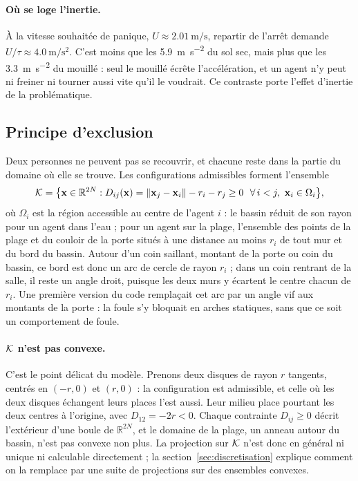 \paragraph{Où se loge l'inertie.}
À la vitesse souhaitée de panique, $U\approx\SI{2.01}{\metre\per\second}$,
repartir de l'arrêt demande $U/\tau\approx\SI{4.0}{\metre\per\second\squared}$.
C'est moins que les \SI{5.9}{\metre\per\second\squared} du sol sec, mais plus que
les \SI{3.3}{\metre\per\second\squared} du mouillé : seul le mouillé écrête
l'accélération, et un agent n'y peut ni freiner ni tourner aussi vite qu'il le
voudrait. Ce contraste porte l'effet d'inertie de la problématique.

\subsection{Principe d'exclusion}
\label{sec:exclusion}

Deux personnes ne peuvent pas se recouvrir, et chacune reste dans la partie du
domaine où elle se trouve. Les configurations admissibles forment l'ensemble
\begin{equation}
\label{eq:admissible}
\mathcal{K}=\bigl\{\mathbf{x}\in\mathbb{R}^{2N} :
D_{ij}(\mathbf{x})=\left\lVert \mathbf{x}_j-\mathbf{x}_i \right\rVert-r_i-r_j\geq 0\ \ \forall\, i<j,\
\mathbf{x}_i\in\Omega_i\bigr\},
\end{equation}
où $\Omega_i$ est la région accessible au centre de l'agent $i$ : le bassin
réduit de son rayon pour un agent dans l'eau ; pour un agent sur la plage,
l'ensemble des points de la plage et du couloir de la porte situés à une
distance au moins $r_i$ de tout mur et du bord du bassin. Autour d'un coin
saillant, montant de la porte ou coin du bassin, ce bord est donc un arc de
cercle de rayon $r_i$ ; dans un coin rentrant de la salle, il reste un angle
droit, puisque les deux murs y écartent le centre chacun de $r_i$. Une
première version du code remplaçait cet arc par un angle vif aux montants de
la porte : la foule s'y bloquait en arches statiques, sans que ce soit un
comportement de foule.

\paragraph{$\mathcal{K}$ n'est pas convexe.}
C'est le point délicat du modèle. Prenons deux disques de rayon $r$ tangents,
centrés en $(-r,0)$ et $(r,0)$ : la configuration est admissible, et celle où
les deux disques échangent leurs places l'est aussi. Leur milieu place pourtant
les deux centres à l'origine, avec $D_{12}=-2r<0$. Chaque contrainte
$D_{ij}\geq0$ décrit l'extérieur d'une boule de $\mathbb{R}^{2N}$, et le
domaine de la plage, un anneau autour du bassin, n'est pas convexe non plus. La
projection sur $\mathcal{K}$ n'est donc en général ni unique ni calculable
directement ; la section~\ref{sec:discretisation} explique comment on la
remplace par une suite de projections sur des ensembles convexes.

